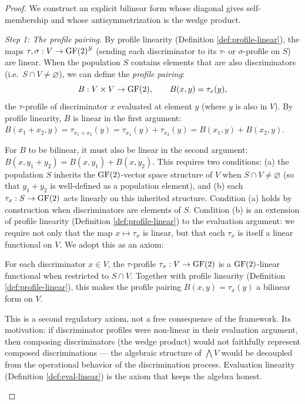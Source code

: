 \begin{proof}
We construct an explicit bilinear form whose diagonal
gives self-membership and whose antisymmetrization is the
wedge product.

\emph{Step 1: The profile pairing.}
By profile linearity (Definition \ref{def:profile-linear}),
the maps $\tau, \sigma: V \to \operatorname{GF}(2)^S$ (sending each
discriminator to its $\tau$- or $\sigma$-profile on $S$)
are linear. When the population $S$ contains elements
that are also discriminators (i.e.\ $S \cap V \neq
\varnothing$), we can define the \emph{profile pairing}:
\begin{equation}\label{eq:profile-pairing}
  B: V \times V \to \operatorname{GF}(2), \qquad
  B(x, y) = \tau_x(y),
\end{equation}
the $\tau$-profile of discriminator $x$ evaluated at
element $y$ (where $y$ is also in $V$). By profile
linearity, $B$ is linear in the first argument:
$B(x_1 + x_2, y) = \tau_{x_1 + x_2}(y) = \tau_{x_1}(y)
+ \tau_{x_2}(y) = B(x_1, y) + B(x_2, y)$.

For $B$ to be bilinear, it must also be linear in the
second argument: $B(x, y_1 + y_2) = B(x, y_1) + B(x, y_2)$.
This requires two conditions: (a) the population $S$
inherits the $\operatorname{GF}(2)$-vector space structure of $V$ when
$S \cap V \neq \varnothing$ (so that $y_1 + y_2$ is
well-defined as a population element), and (b) each
$\tau_x: S \to \operatorname{GF}(2)$ acts linearly on this inherited
structure. Condition (a) holds by construction when
discriminators are elements of $S$. Condition (b) is an
extension of profile linearity (Definition \ref{def:profile-linear}) to the evaluation argument:
we require not only that the map $x \mapsto \tau_x$ is
linear, but that each $\tau_x$ is itself a linear
functional on $V$. We adopt this as an axiom:

\begin{definition}\label{def:eval-linear}
For each discriminator $x \in V$, the $\tau$-profile
$\tau_x: V \to \operatorname{GF}(2)$ is a $\operatorname{GF}(2)$-linear functional
when restricted to $S \cap V$. Together with profile
linearity (Definition \ref{def:profile-linear}), this
makes the profile pairing $B(x,y) = \tau_x(y)$ a
bilinear form on $V$.

This is a second regulatory axiom, not a free consequence
of the framework. Its motivation: if discriminator
profiles were non-linear in their evaluation argument,
then composing discriminators (the wedge product) would
not faithfully represent composed discriminations ---
the algebraic structure of $\bigwedge V$ would be
decoupled from the operational behavior of the
discrimination process. Evaluation linearity (Definition \ref{def:eval-linear}) is the
axiom that keeps the algebra honest.


\end{definition}
\end{proof}
